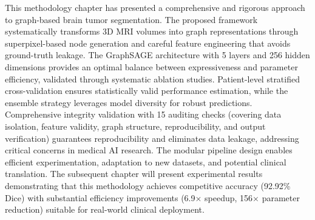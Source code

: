 \vspace{5mm}

This methodology chapter has presented a comprehensive and rigorous approach to graph-based brain tumor segmentation. The proposed framework systematically transforms 3D MRI volumes into graph representations through superpixel-based node generation and careful feature engineering that avoids ground-truth leakage. The GraphSAGE architecture with 5 layers and 256 hidden dimensions provides an optimal balance between expressiveness and parameter efficiency, validated through systematic ablation studies. Patient-level stratified cross-validation ensures statistically valid performance estimation, while the ensemble strategy leverages model diversity for robust predictions. Comprehensive integrity validation with 15 auditing checks (covering data isolation, feature validity, graph structure, reproducibility, and output verification) guarantees reproducibility and eliminates data leakage, addressing critical concerns in medical AI research. The modular pipeline design enables efficient experimentation, adaptation to new datasets, and potential clinical translation. The subsequent chapter will present experimental results demonstrating that this methodology achieves competitive accuracy (92.92\% Dice) with substantial efficiency improvements (6.9$\times$ speedup, 156$\times$ parameter reduction) suitable for real-world clinical deployment.

\clearpage


